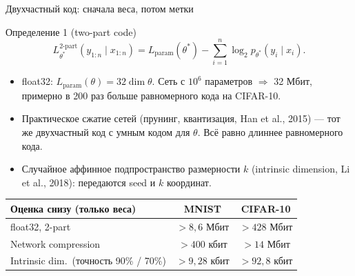 \documentclass[aspectratio=169,10pt]{beamer}
\newcommand{\yx}{y_{1:n}\mid x_{1:n}}
\begin{document}
\begin{frame}{Двухчастный код: сначала веса, потом метки}
  \begin{block}{Определение 1 (two-part code)}
    \[
      L^{\text{2-part}}_{\theta^*}(\yx)=L_{\mathrm{param}}(\theta^*)-\sum_{i=1}^n\log_2p_{\theta^*}(y_i\mid x_i).
    \]
  \end{block}
  \begin{itemize}
    \item float32: $L_{\mathrm{param}}(\theta)=32\dim\theta$. Сеть с $10^6$ параметров $\Rightarrow$ 32 Мбит, примерно в 200 раз больше равномерного кода на CIFAR-10.
    \item Практическое сжатие сетей (прунинг, квантизация, Han et al., 2015) --- тот же двухчастный код с умным кодом для $\theta$. Всё равно длиннее равномерного кода.
    \item Случайное аффинное подпространство размерности $k$ (intrinsic dimension, Li et al., 2018): передаются seed и $k$ координат.
  \end{itemize}
  \begin{center}
  \small
  \begin{tabular}{lcc}
    \toprule
    Оценка снизу (только веса) & MNIST & CIFAR-10 \\
    \midrule
    float32, 2-part & $>8{,}6$ Мбит & $>428$ Мбит \\
    Network compression & $>400$ кбит & $>14$ Мбит \\
    Intrinsic dim.\ (точность 90\% / 70\%) & $>9{,}28$ кбит & $>92{,}8$ кбит \\
    \bottomrule
  \end{tabular}
  \end{center}
\end{frame}
\end{document}
